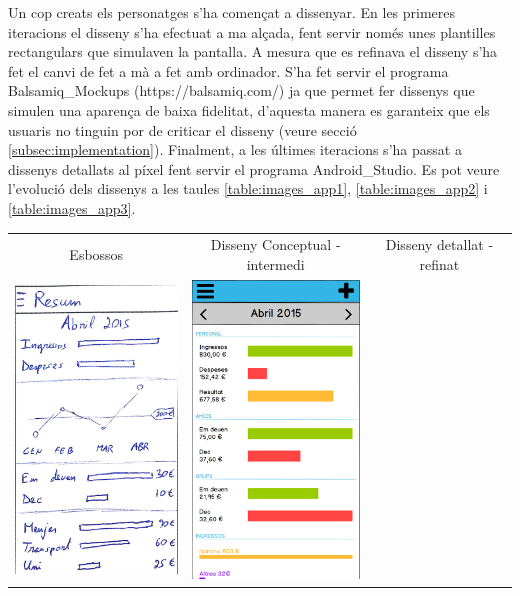 Un cop creats els personatges s'ha començat a dissenyar. En les primeres iteracions el disseny s'ha efectuat a ma alçada, fent servir només unes plantilles rectangulars que simulaven la pantalla. A mesura que es refinava el disseny s'ha fet el canvi de fet a mà a fet amb ordinador. S'ha fet servir el programa \gls{Balsamiq_Mockups} (https://balsamiq.com/) ja que permet fer dissenys que simulen una aparença de baixa fidelitat, d'aquesta manera es garanteix que els usuaris no tinguin por de criticar el disseny (veure secció \ref{subsec:implementation}). Finalment, a les últimes iteracions s'ha passat a dissenys detallats al píxel fent servir el programa \gls{Android_Studio}. Es pot veure l'evolució dels dissenys a les taules \ref{table:images_app1}, \ref{table:images_app2} i \ref{table:images_app3}.

\begin{table}
\begin{tabular}{| c | c | c |}
\hline
Esbossos & Disseny Conceptual - intermedi & Disseny detallat - refinat \\
\includegraphics[width=50mm]{1_Dashboard.jpg} &
\includegraphics[width=50mm]{2_Dashboard.png} &

\end{tabular}
\end{table}
